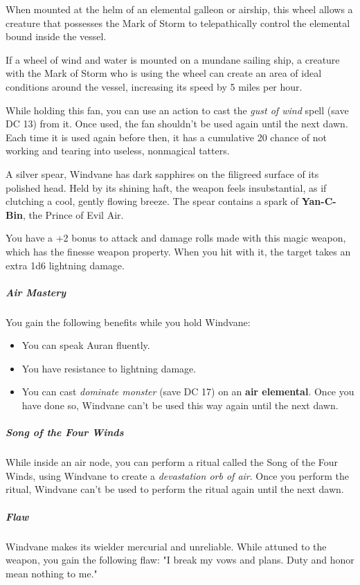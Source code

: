 \documentclass[10pt,a4paper,twoside,bg=print,twocolumn,openany,nodeprecatedcode]{dndbook}
\begin{document}
When mounted at the helm of an elemental galleon or airship, this wheel allows a creature that possesses the Mark of Storm to telepathically control the elemental bound inside the vessel.

If a wheel of wind and water is mounted on a mundane sailing ship, a creature with the Mark of Storm who is using the wheel can create an area of ideal conditions around the vessel, increasing its speed by 5 miles per hour.

While holding this fan, you can use an action to cast the \textit{gust of wind} spell (save DC 13) from it. Once used, the fan shouldn't be used again until the next dawn. Each time it is used again before then, it has a cumulative 20 chance of not working and tearing into useless, nonmagical tatters.

A silver spear, Windvane has dark sapphires on the filigreed surface of its polished head. Held by its shining haft, the weapon feels insubstantial, as if clutching a cool, gently flowing breeze. The spear contains a spark of \textbf{Yan-C-Bin}, the Prince of Evil Air.

You have a +2 bonus to attack and damage rolls made with this magic weapon, which has the finesse weapon property. When you hit with it, the target takes an extra 1d6 lightning damage.

\subparagraph{Air Mastery}
You gain the following benefits while you hold Windvane:


\begin{itemize}
\item You can speak Auran fluently.
\item You have resistance to lightning damage.
\item You can cast \textit{dominate monster} (save DC 17) on an \textbf{air elemental}. Once you have done so, Windvane can't be used this way again until the next dawn.
\end{itemize}

\subparagraph{Song of the Four Winds}
While inside an air node, you can perform a ritual called the Song of the Four Winds, using Windvane to create a \textit{devastation orb of air}. Once you perform the ritual, Windvane can't be used to perform the ritual again until the next dawn.

\subparagraph{Flaw}
Windvane makes its wielder mercurial and unreliable. While attuned to the weapon, you gain the following flaw: "I break my vows and plans. Duty and honor mean nothing to me."
\end{document}
